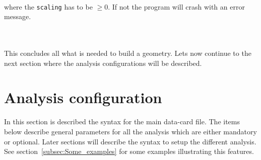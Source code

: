 ~\\
\noindent
where the {\tt scaling} has to be $\geq 0$. If not the program will crash with an error message.

~\\
~\\
\noindent
This concludes all what is needed to build a geometry. Lets now continue to the next section where the analysis configurations will be described.


\section{Analysis configuration}
\label{sec:analysis_config}

In this section is described the syntax for the main data-card file. The items below describe general parameters for all the analysis which are either mandatory or optional. 
Later sections will describe the syntax to setup the different analysis. See section~\ref{subsec:Some_examples} for some examples illustrating this features.

